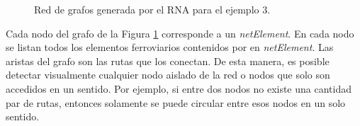 \begin{figure}[H]
		\centering\caption{Red de grafos generada por el RNA para el ejemplo 3.}
		\label{fig:EJ3_8}
	\end{figure}
	
	Cada nodo del grafo de la Figura \ref{fig:EJ3_8} corresponde a un \textit{netElement}. En cada nodo se listan todos los elementos ferroviarios contenidos por en \textit{netElement}. Las aristas del grafo son las rutas que los conectan. De esta manera, es posible detectar visualmente cualquier nodo aislado de la red o nodos que solo son accedidos en un sentido. Por ejemplo, si entre dos nodos no existe una cantidad par de rutas, entonces solamente se puede circular entre esos nodos en un solo sentido.